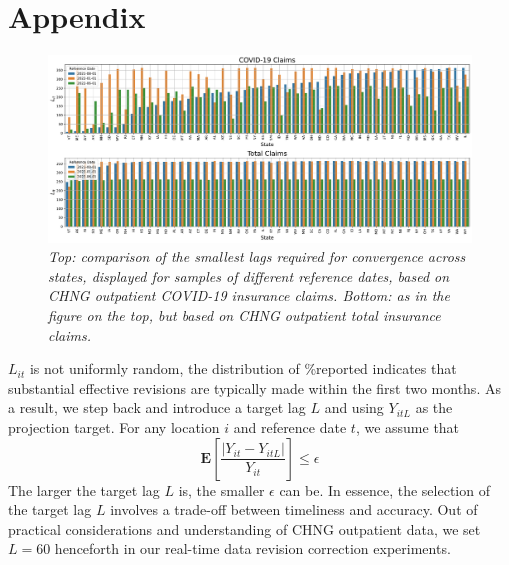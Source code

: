 \section{Appendix}
\renewcommand{\thefigure}{S\arabic{figure}} %
\setcounter{figure}{0} %
\begin{figure}[h!]
    \centering
    \includegraphics[width=\textwidth]{figs/Lit_examples.pdf}
    \caption{\emph{Top: comparison of the smallest lags required for convergence across states, displayed for samples of different reference dates, based on CHNG outpatient COVID-19 insurance claims. Bottom: as in the figure on the top, but based on CHNG outpatient total insurance claims.}}
\end{figure}


$L_{it}$ is not uniformly random, the distribution of \%reported indicates that substantial effective revisions are typically made within the first two months. As a result, we step back and introduce a target lag $L$ and using $Y_{itL}$ as the projection target. For any location $i$ and reference date $t$, we assume that $$\mathbf{E}[\frac{| Y_{it} - Y_{itL}|}{Y_{it}}] \leq \epsilon $$ The larger the target lag $L$ is, the smaller $\epsilon$ can be. In essence, the selection of the target lag $L$ involves a trade-off between timeliness and accuracy. Out of practical considerations and understanding of CHNG outpatient data, we set $L=60$ henceforth in our real-time data revision correction experiments.
\clearpage
